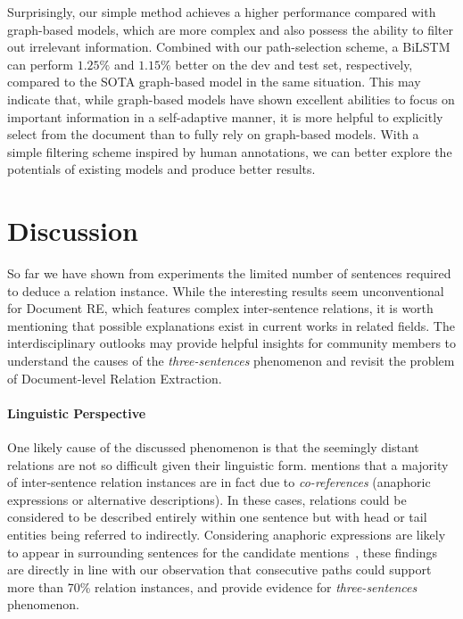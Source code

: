 \documentclass[11pt,a4paper]{article}
\begin{document}
Surprisingly, our simple method achieves a higher performance compared with graph-based models, which are more complex and also possess the ability to filter out irrelevant information. Combined with our path-selection scheme, a BiLSTM can perform $1.25\%$ and $1.15\%$ better on the dev and test set, respectively, compared to the SOTA graph-based model in the same situation. This may indicate that, while graph-based models have shown excellent abilities to focus on important information in a self-adaptive manner, it is more helpful to explicitly select from the document than to fully rely on graph-based models. With a simple filtering scheme inspired by human annotations, we can better explore the potentials of existing models and produce better results.

\section{Discussion}
So far we have shown from experiments the limited number of sentences required to deduce a relation instance. While the interesting results seem unconventional for Document RE, which features complex inter-sentence relations, it is worth mentioning that possible explanations exist in current works in related fields. The interdisciplinary outlooks may provide helpful insights for community members to understand the causes of the \textit{three-sentences} phenomenon and revisit the problem of Document-level Relation Extraction.

\paragraph{Linguistic Perspective} 
One likely cause of the discussed phenomenon is that the seemingly distant relations are not so difficult given their linguistic form. \citet{stevenson2006fact} mentions that a majority of inter-sentence relation instances are in fact due to \textit{co-references} (anaphoric expressions or alternative descriptions). In these cases, relations could be considered to be described entirely within one sentence but with head or tail entities being referred to indirectly. Considering anaphoric expressions are likely to appear in surrounding sentences for the candidate mentions~\cite{chowdhury2013controlled}, these findings are directly in line with our observation that consecutive paths could support more than 70\% relation instances, and provide evidence for \textit{three-sentences} phenomenon.
\end{document}
